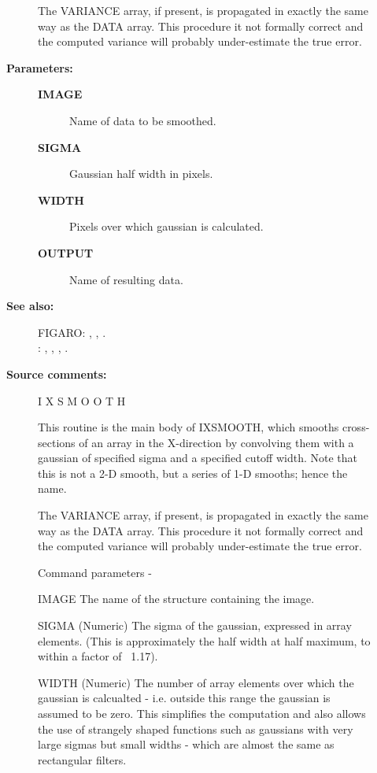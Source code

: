 \begin{description}
\begin{description}
 The VARIANCE array, if present, is propagated in exactly the same
 way as the DATA array.  This procedure it not formally correct and
 the computed variance will probably under-estimate the true error.

\item [\textbf{Parameters:}]
\begin{description}
\item [\textbf{IMAGE}]
 Name of data to be smoothed.
\item [\textbf{SIGMA}]
 Gaussian half width in pixels.
\item [\textbf{WIDTH}]
 Pixels over which gaussian is calculated.
\item [\textbf{OUTPUT}]
 Name of resulting data.
\end{description}

\item [\textbf{See also:}]
FIGARO: , , .\\
: , , , .\\

\item [\textbf{Source comments:}]
\begin{terminalv}
 I X S M O O T H

 This routine is the main body of IXSMOOTH, which smooths
 cross-sections of an array in the X-direction by convolving
 them with a gaussian of specified sigma and a specified
 cutoff width.  Note that this is not a 2-D smooth, but a series
 of 1-D smooths; hence the name.

 The VARIANCE array, if present, is propagated in exactly the same
 way as the DATA array.  This procedure it not formally correct and
 the computed variance will probably under-estimate the true error.

 Command parameters -

 IMAGE  The name of the structure containing the image.

 SIGMA  (Numeric) The sigma of the gaussian, expressed in array
        elements.  (This is approximately the half width at
        half maximum, to within a factor of ~1.17).

 WIDTH  (Numeric) The number of array elements over which the
        gaussian is calcualted - i.e. outside this range the
        gaussian is assumed to be zero.  This simplifies the
        computation and also allows the use of strangely shaped
        functions such as gaussians with very large sigmas but
        small widths - which are almost the same as rectangular
        filters.


\end{terminalv}
\end{description}
\end{description}
